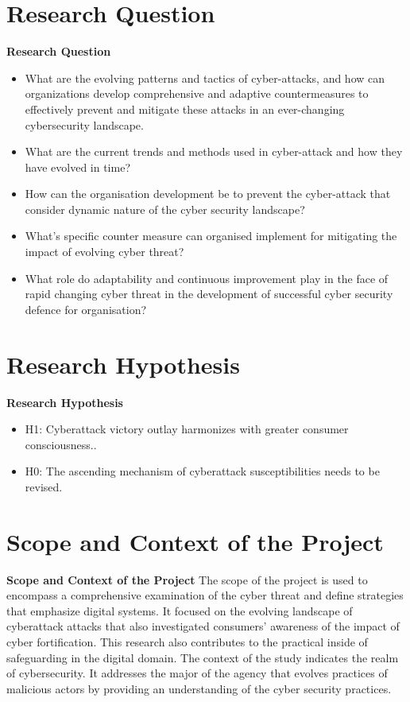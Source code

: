 
\section{Research Question}
\label{sec:into_back}
\textbf{Research Question}
\begin{itemize}
    \item What are the evolving patterns and tactics of cyber-attacks, and how can organizations develop comprehensive and adaptive countermeasures to effectively prevent and mitigate these attacks in an ever-changing cybersecurity landscape.
    \item What are the current trends and methods used in cyber-attack and how they have evolved in time?
    \item How can the organisation development be to prevent the cyber-attack that consider dynamic nature of the cyber security landscape? 
    \item What's specific counter measure can organised implement for mitigating the impact of evolving cyber threat? 
    \item What role do adaptability and continuous improvement play in the face of rapid changing cyber threat in the development of successful cyber security defence for organisation?
\end{itemize}

\section{Research Hypothesis}
\label{sec:into_back}
\textbf{Research Hypothesis}
\begin{itemize}
     
    \item H1: Cyberattack victory outlay harmonizes with greater consumer consciousness..
    \item H0: The ascending mechanism of cyberattack susceptibilities needs to be revised.

\end{itemize}


\section{Scope and Context of the Project}
\label{sec:into_back}
\textbf{Scope and Context of the Project}
The scope of the project is used to encompass a comprehensive examination of the cyber threat 
and define strategies that emphasize digital systems. It focused on the evolving landscape of 
cyberattack attacks that also investigated consumers' awareness of the impact of cyber 
fortification. This research also contributes to the practical inside of safeguarding in the 
digital domain.
The context of the study indicates the realm of cybersecurity. It addresses the major of the 
agency that evolves practices of malicious actors by providing an understanding of the cyber 
security practices.


